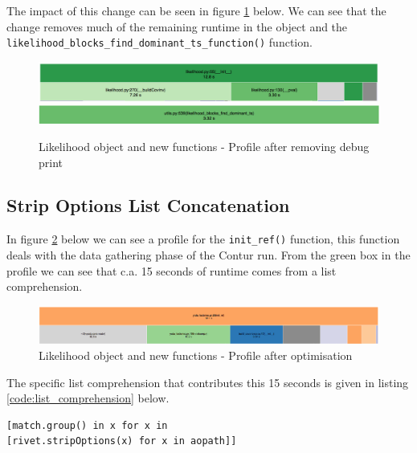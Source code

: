 The impact of this change can be seen in figure \ref{fig:like_last_profile_after_debugger} below. We can see that the change removes much of the remaining runtime in the  object and the \texttt{likelihood\_blocks\_find\_dominant\_ts\_function()} function.

\begin{figure}[H]
\centering
\includegraphics[scale=0.3]{plots/like_after_change.png}
\includegraphics[scale=0.3]{plots/like_blocks_find_dominant_ts.png}
\caption{Likelihood object and new functions - Profile after removing debug print}
\label{fig:like_last_profile_after_debugger}
\end{figure}


\subsection{Strip Options List Concatenation}
In figure \ref{fig:comprehension_before} below we can see a profile for the \texttt{init\_ref()} function, this function deals with the data gathering phase of the Contur run. From the green box in the profile we can see that c.a. 15 seconds of runtime comes from a list comprehension.

\begin{figure}[H]
\centering
\includegraphics[scale=0.3]{plots/list_comprehension_before.png}
\caption{Likelihood object and new functions - Profile after optimisation}
\label{fig:comprehension_before}
\end{figure}

The specific list comprehension that contributes this 15 seconds is given in listing \ref{code:list_comprehension} below.

\begin{code}
\label{code:list_comprehension}
\begin{verbatim}
[match.group() in x for x in 
[rivet.stripOptions(x) for x in aopath]]
\end{verbatim}
\end{code}

